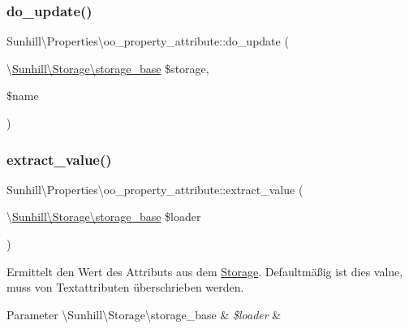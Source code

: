 \subsubsection{\texorpdfstring{do\+\_\+update()}{do\_update()}}
{\footnotesize\ttfamily Sunhill\textbackslash{}\+Properties\textbackslash{}oo\+\_\+property\+\_\+attribute\+::do\+\_\+update (\begin{DoxyParamCaption}\item[{\textbackslash{}\hyperlink{classSunhill_1_1Storage_1_1storage__base}{Sunhill\textbackslash{}\+Storage\textbackslash{}storage\+\_\+base}}]{\$storage,  }\item[{}]{\$name }\end{DoxyParamCaption})\hspace{0.3cm}{\ttfamily [protected]}}

\mbox{\label{classSunhill_1_1Properties_1_1oo__property__attribute_a14fada4d5f16e5eccdc6a93c08b88094}} 
\subsubsection{\texorpdfstring{extract\+\_\+value()}{extract\_value()}}
{\footnotesize\ttfamily Sunhill\textbackslash{}\+Properties\textbackslash{}oo\+\_\+property\+\_\+attribute\+::extract\+\_\+value (\begin{DoxyParamCaption}\item[{\textbackslash{}\hyperlink{classSunhill_1_1Storage_1_1storage__base}{Sunhill\textbackslash{}\+Storage\textbackslash{}storage\+\_\+base}}]{\$loader }\end{DoxyParamCaption})\hspace{0.3cm}{\ttfamily [protected]}}

Ermittelt den Wert des Attributs aus dem \hyperlink{namespaceSunhill_1_1Storage}{Storage}. Defaultmäßig ist dies value, muss von Textattributen überschrieben werden. 
\begin{DoxyParams}[1]{Parameter}
\textbackslash{}\+Sunhill\textbackslash{}\+Storage\textbackslash{}storage\+\_\+base & {\em \$loader} & \\
\hline
\end{DoxyParams}
\mbox{\label{classSunhill_1_1Properties_1_1oo__property__attribute_aa979e9a26755c6d66bde762f58be4a79}} 
